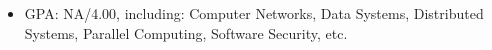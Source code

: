 
\begin{itemize}[nosep]
    \item GPA: NA/4.00, including: Computer Networks, Data Systems, Distributed Systems, Parallel Computing, Software Security, etc.
\end{itemize}
